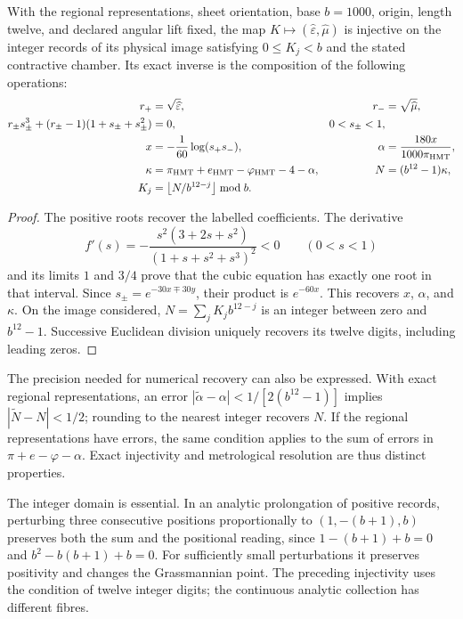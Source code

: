 \begin{theorem}
\label{thm:compat-recuperacion-constitutiva}
With the regional representations, sheet orientation,
base \(b=1000\), origin, length twelve, and declared angular lift
fixed, the map
\(K\mapsto(\widehat\varepsilon,\widehat\mu)\) is injective
on the integer records of its physical image satisfying
\(0\leq K_j<b\) and the stated contractive chamber. Its exact inverse
is the composition of the following operations:
\begin{align*}
 r_+&=\sqrt{\widehat\varepsilon},&
 r_-&=\sqrt{\widehat\mu},\\
 r_\pm s_\pm^3+(r_\pm-1)(1+s_\pm+s_\pm^2)&=0,
 &0<s_\pm<1,\\
 x&=-\frac1{60}\log(s_+s_-),&
 \alpha&=\frac{180x}{1000\pi_{\rm HMT}},\\
 \kappa&=\pi_{\rm HMT}+e_{\rm HMT}-\varphi_{\rm HMT}-4-\alpha,
 &N&=(b^{12}-1)\kappa,\\
 K_j&=\left\lfloor N/b^{12-j}\right\rfloor\bmod b.
\end{align*}
\end{theorem}
\begin{proof}
The positive roots recover the labelled coefficients.
The derivative
\[
 f'(s)=-\frac{s^2(3+2s+s^2)}{(1+s+s^2+s^3)^2}<0
 \qquad(0<s<1)
\]
and its limits \(1\) and \(3/4\) prove that the cubic equation
has exactly one root in that interval. Since
\(s_\pm=e^{-30x\mp30y}\), their product is \(e^{-60x}\).
This recovers \(x\), \(\alpha\), and \(\kappa\).
On the image considered, \(N=\sum_jK_jb^{12-j}\) is an integer
between zero and \(b^{12}-1\). Successive Euclidean division uniquely recovers
its twelve digits, including leading zeros.
\end{proof}

The precision needed for numerical recovery can also be
expressed. With exact regional representations, an error
\(|\widetilde\alpha-\alpha|<1/[2(b^{12}-1)]\) implies
\(|\widetilde N-N|<1/2\); rounding to the nearest integer
recovers \(N\). If the regional representations have errors, the
same condition applies to the sum of errors in
\(\pi+e-\varphi-\alpha\). Exact injectivity and metrological
resolution are thus distinct properties.

The integer domain is essential. In an analytic prolongation of
positive records, perturbing three consecutive positions
proportionally to \((1,-(b+1),b)\) preserves both the sum and the
positional reading, since
\(1-(b+1)+b=0\) and \(b^2-b(b+1)+b=0\).
For sufficiently small perturbations it preserves positivity
and changes the Grassmannian point. The preceding injectivity uses
the condition of twelve integer digits; the continuous analytic collection
has different fibres.

